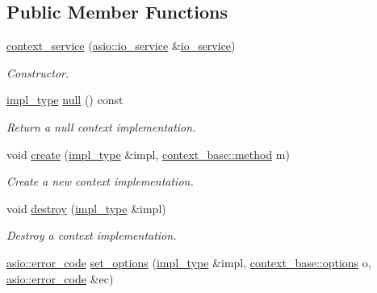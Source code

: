 \subsection*{Public Member Functions}
\begin{DoxyCompactItemize}
\item 
\hyperlink{classasio_1_1ssl_1_1old_1_1context__service_a2a7bd3961e7f18487454b4dbd695e748}{context\+\_\+service} (\hyperlink{classasio_1_1io__service}{asio\+::io\+\_\+service} \&\hyperlink{classasio_1_1io__service}{io\+\_\+service})
\begin{DoxyCompactList}\small\item\em Constructor. \end{DoxyCompactList}\item 
\hyperlink{classasio_1_1ssl_1_1old_1_1context__service_aa082808edcf9f9da07eaf4077d1d8de0}{impl\+\_\+type} \hyperlink{classasio_1_1ssl_1_1old_1_1context__service_a0cf290f0327814a66e827112bc3fc2c1}{null} () const 
\begin{DoxyCompactList}\small\item\em Return a null context implementation. \end{DoxyCompactList}\item 
void \hyperlink{classasio_1_1ssl_1_1old_1_1context__service_a9198bc48f13af27e3ba4419edc0072c0}{create} (\hyperlink{classasio_1_1ssl_1_1old_1_1context__service_aa082808edcf9f9da07eaf4077d1d8de0}{impl\+\_\+type} \&impl, \hyperlink{classasio_1_1ssl_1_1context__base_ac37d498266e3b13607f011ace6417525}{context\+\_\+base\+::method} m)
\begin{DoxyCompactList}\small\item\em Create a new context implementation. \end{DoxyCompactList}\item 
void \hyperlink{classasio_1_1ssl_1_1old_1_1context__service_a64b41f398ebffe9480bb8865f1b7f562}{destroy} (\hyperlink{classasio_1_1ssl_1_1old_1_1context__service_aa082808edcf9f9da07eaf4077d1d8de0}{impl\+\_\+type} \&impl)
\begin{DoxyCompactList}\small\item\em Destroy a context implementation. \end{DoxyCompactList}\item 
\hyperlink{classasio_1_1error__code}{asio\+::error\+\_\+code} \hyperlink{classasio_1_1ssl_1_1old_1_1context__service_a8efa1bde1ace7790a3bee1d0f98bbfb1}{set\+\_\+options} (\hyperlink{classasio_1_1ssl_1_1old_1_1context__service_aa082808edcf9f9da07eaf4077d1d8de0}{impl\+\_\+type} \&impl, \hyperlink{classasio_1_1ssl_1_1context__base_a12d5d28abeb47c91311bf13740dec514}{context\+\_\+base\+::options} o, \hyperlink{classasio_1_1error__code}{asio\+::error\+\_\+code} \&ec)

\end{DoxyCompactItemize}
